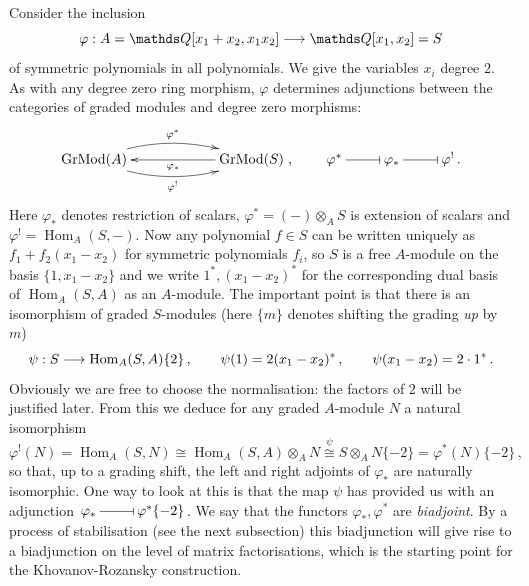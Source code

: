 \documentclass{compositio}
\theoremstyle{definition}
\numberwithin{equation}{section}
\def\Hom{\operatorname{Hom}}
\def\Grmodd{\operatorname{GrMod}}
\begin{document}
Consider the inclusion
\[
\varphi: A = \QQ[x_1 + x_2, x_1 x_2] \lto \QQ[x_1,x_2] = S
\]
of symmetric polynomials in all polynomials. We give the variables $x_i$ degree $2$. As with any degree zero ring morphism, $\varphi$ determines adjunctions between the categories of graded modules and degree zero morphisms: 
\[
\xymatrix@C+3pc{
\Grmodd(A) \ar@/^1pc/[r]^-{\varphi^*} \ar@/_1pc/[r]_-{\varphi^!} & \Grmodd(S) \ar[l]^-{\varphi_*}
}, \qquad
\xymatrix{
\varphi^* \ar@{-|}[r] & \varphi_* \ar@{-|}[r] & \varphi^!\,.
}
\]
Here $\varphi_*$ denotes restriction of scalars, $\varphi^* = (-) \otimes_A S$ is extension of scalars and $\varphi^! = \Hom_A(S, -)$. Now any polynomial $f \in S$ can be written uniquely as $f_1 + f_2(x_1-x_2)$ for symmetric polynomials $f_i$, so $S$ is a free $A$-module on the basis $\{1, x_1 - x_2\}$ and we write $1^*, (x_1-x_2)^*$ for the corresponding dual basis of $\Hom_A(S,A)$ as an $A$-module. The important point is that there is an isomorphism of graded $S$-modules (here $\{ m \}$ denotes shifting the grading \emph{up} by $m$)
\[
\psi: S \lto \Hom_A(S,A)\{2\} \, , \qquad \psi(1) = 2(x_1-x_2)^* \, , \qquad \psi(x_1-x_2) = 2 \cdot 1^* \, .
\]
Obviously we are free to choose the normalisation: the factors of $2$ will be justified later. From this we deduce for any graded $A$-module $N$ a natural isomorphism 
\[
\varphi^!(N) = \Hom_A(S,N) \cong \Hom_A(S,A) \otimes_A N \stackrel{\psi}{\cong} S \otimes_A N \{-2\} = \varphi^*(N)\{-2\} \, ,
\]
so that, up to a grading shift, the left and right adjoints of $\varphi_*$ are naturally isomorphic. One way to look at this is that the map $\psi$ has provided us with an adjunction $\xymatrix@1{\varphi_*\, \ar@{-|}[r] & \,\varphi^*\{-2\}}$. We say that the functors $\varphi_*, \varphi^*$ are \emph{biadjoint}. By a process of stabilisation (see the next subsection) this biadjunction will give rise to a biadjunction on the level of matrix factorisations, which is the starting point for the Khovanov-Rozansky construction.
\end{document}

